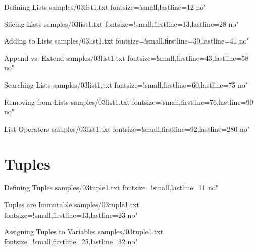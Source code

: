 \documentclass{pyslides}
\begin{document}
\begin{frame}[fragile]{Defining Lists}
 samples/03list1.txt fontsize=!small,lastline=12 no"
\end{frame}

\begin{frame}[fragile]{Slicing Lists}
 samples/03list1.txt fontsize=!small,firstline=13,lastline=28 no"
\end{frame}

\begin{frame}[fragile]{Adding to Lists}
 samples/03list1.txt fontsize=!small,firstline=30,lastline=41 no"
\end{frame}

\begin{frame}[fragile]{Append vs. Extend}
 samples/03list1.txt fontsize=!small,firstline=43,lastline=58 no"
\end{frame}

\begin{frame}[fragile]{Searching Lists}
 samples/03list1.txt fontsize=!small,firstline=60,lastline=75 no"
\end{frame}

\begin{frame}[fragile]{Removing from Lists}
 samples/03list1.txt fontsize=!small,firstline=76,lastline=90 no"
\end{frame}

\begin{frame}[fragile]{List Operators}
 samples/03list1.txt fontsize=!small,firstline=92,lastline=280 no"
\end{frame}

\section{Tuples}

\begin{frame}[fragile]{Defining Tuples}
 samples/03tuple1.txt fontsize=!small,lastline=11 no"
\end{frame}

\begin{frame}[fragile]{Tuples are Immutable}
 samples/03tuple1.txt fontsize=!small,firstline=13,lastline=23 no"
\end{frame}

\begin{frame}[fragile]{Assigning Tuples to Variables}
 samples/03tuple1.txt fontsize=!small,firstline=25,lastline=32 no"
\end{frame}
\end{document}
